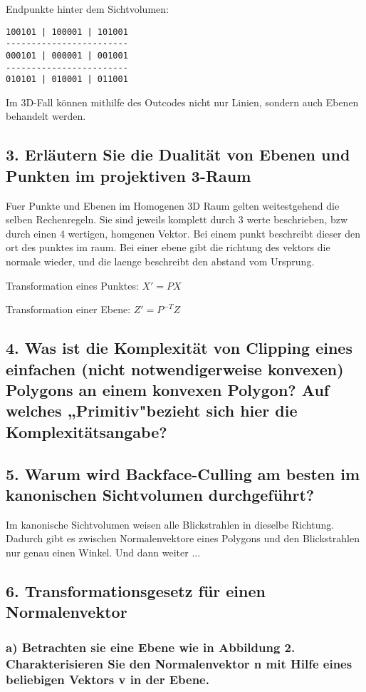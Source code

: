 \documentclass[a4paper,headings=small]{scrartcl}
\numberwithin{equation}{section} %
\numberwithin{figure}{section}   %
\begin{document}
Endpunkte hinter dem Sichtvolumen:
\begin{verbatim}
100101 | 100001 | 101001
------------------------
000101 | 000001 | 001001
------------------------
010101 | 010001 | 011001
\end{verbatim}

Im 3D-Fall können mithilfe des Outcodes nicht nur Linien, sondern auch Ebenen behandelt werden.

\subsection{3. Erläutern Sie die Dualität von Ebenen und Punkten im projektiven 3-Raum}
Fuer Punkte und Ebenen im Homogenen 3D Raum gelten weitestgehend die selben Rechenregeln.
Sie sind jeweils komplett durch 3 werte beschrieben, bzw durch einen 4 wertigen, homgenen Vektor.
Bei einem punkt beschreibt dieser den ort des punktes im raum.
Bei einer ebene gibt die richtung des vektors die normale wieder,
und die laenge beschreibt den abstand vom Ursprung.

Transformation eines Punktes: $X' = P X$

Transformation einer Ebene: $Z' = P^{-T} Z$

\subsection{4. Was ist die Komplexität von Clipping eines einfachen (nicht notwendigerweise konvexen) Polygons an einem konvexen Polygon? Auf welches „Primitiv"bezieht sich hier die Komplexitätsangabe?}

\subsection{5. Warum wird Backface-Culling am besten im kanonischen Sichtvolumen durchgeführt?}

Im kanonische Sichtvolumen weisen alle Blickstrahlen in dieselbe Richtung. Dadurch gibt es zwischen Normalenvektore eines Polygons und den Blickstrahlen nur genau einen Winkel. Und dann weiter ...

\subsection{6. Transformationsgesetz für einen Normalenvektor}

\subsubsection{a) Betrachten sie eine Ebene wie in Abbildung 2. Charakterisieren Sie den Normalenvektor n mit Hilfe eines beliebigen Vektors v in der Ebene.}
\end{document}
